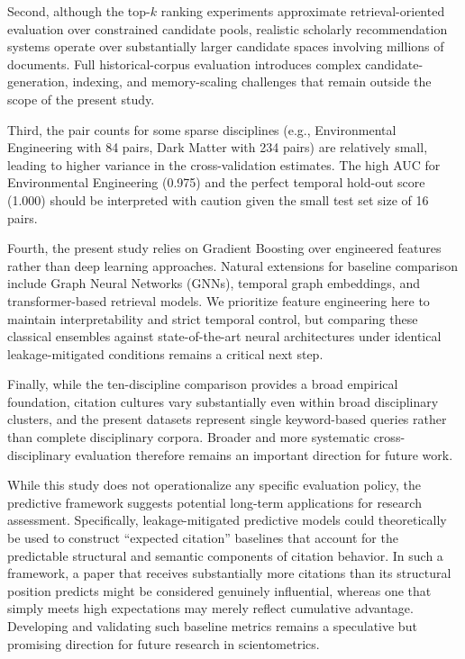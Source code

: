 \documentclass[11pt,a4paper]{article}
\begin{document}
Second, although the top-\(k\) ranking experiments approximate retrieval-oriented evaluation over constrained candidate pools, realistic scholarly recommendation systems operate over substantially larger candidate spaces involving millions of documents. Full historical-corpus evaluation introduces complex candidate-generation, indexing, and memory-scaling challenges that remain outside the scope of the present study.

Third, the pair counts for some sparse disciplines (e.g., Environmental Engineering with 84 pairs, Dark Matter with 234 pairs) are relatively small, leading to higher variance in the cross-validation estimates. The high AUC for Environmental Engineering (0.975) and the perfect temporal hold-out score (1.000) should be interpreted with caution given the small test set size of 16 pairs.

Fourth, the present study relies on Gradient Boosting over engineered features rather than deep learning approaches. Natural extensions for baseline comparison include Graph Neural Networks (GNNs), temporal graph embeddings, and transformer-based retrieval models. We prioritize feature engineering here to maintain interpretability and strict temporal control, but comparing these classical ensembles against state-of-the-art neural architectures under identical leakage-mitigated conditions remains a critical next step.

Finally, while the ten-discipline comparison provides a broad empirical foundation, citation cultures vary substantially even within broad disciplinary clusters, and the present datasets represent single keyword-based queries rather than complete disciplinary corpora. Broader and more systematic cross-disciplinary evaluation therefore remains an important direction for future work.

While this study does not operationalize any specific evaluation policy, the predictive framework suggests potential long-term applications for research assessment. Specifically, leakage-mitigated predictive models could theoretically be used to construct ``expected citation'' baselines that account for the predictable structural and semantic components of citation behavior. In such a framework, a paper that receives substantially more citations than its structural position predicts might be considered genuinely influential, whereas one that simply meets high expectations may merely reflect cumulative advantage. Developing and validating such baseline metrics remains a speculative but promising direction for future research in scientometrics.
\end{document}
